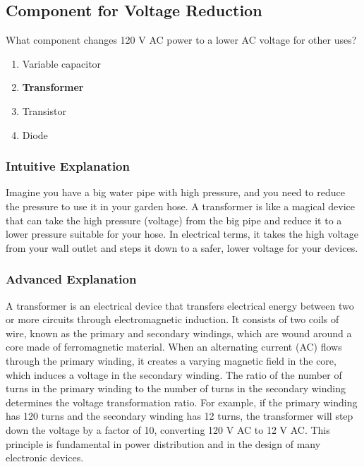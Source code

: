 \subsection{Component for Voltage Reduction}
\label{T6D06}

\begin{tcolorbox}[colback=gray!10!white,colframe=black!75!black,title=T6D06]
What component changes 120 V AC power to a lower AC voltage for other uses?
\begin{enumerate}[noitemsep]
    \item Variable capacitor
    \item \textbf{Transformer}
    \item Transistor
    \item Diode
\end{enumerate}
\end{tcolorbox}

\subsubsection*{Intuitive Explanation}
Imagine you have a big water pipe with high pressure, and you need to reduce the pressure to use it in your garden hose. A transformer is like a magical device that can take the high pressure (voltage) from the big pipe and reduce it to a lower pressure suitable for your hose. In electrical terms, it takes the high voltage from your wall outlet and steps it down to a safer, lower voltage for your devices.

\subsubsection*{Advanced Explanation}
A transformer is an electrical device that transfers electrical energy between two or more circuits through electromagnetic induction. It consists of two coils of wire, known as the primary and secondary windings, which are wound around a core made of ferromagnetic material. When an alternating current (AC) flows through the primary winding, it creates a varying magnetic field in the core, which induces a voltage in the secondary winding. The ratio of the number of turns in the primary winding to the number of turns in the secondary winding determines the voltage transformation ratio. For example, if the primary winding has 120 turns and the secondary winding has 12 turns, the transformer will step down the voltage by a factor of 10, converting 120 V AC to 12 V AC. This principle is fundamental in power distribution and in the design of many electronic devices.